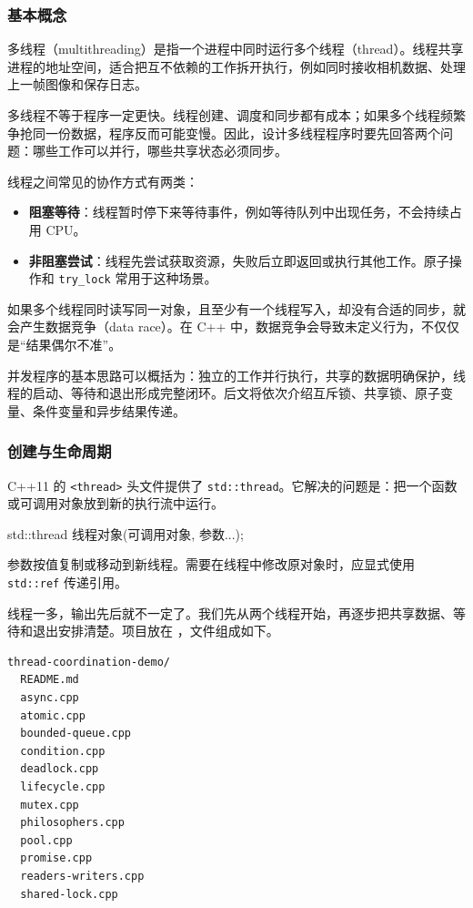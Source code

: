 
\subsubsection{基本概念}
多线程（multithreading）是指一个进程中同时运行多个线程（thread）。线程共享进程的地址空间，适合把互不依赖的工作拆开执行，例如同时接收相机数据、处理上一帧图像和保存日志。

多线程不等于程序一定更快。线程创建、调度和同步都有成本；如果多个线程频繁争抢同一份数据，程序反而可能变慢。因此，设计多线程程序时要先回答两个问题：哪些工作可以并行，哪些共享状态必须同步。

线程之间常见的协作方式有两类：
\begin{itemize}
    \item \textbf{阻塞等待}：线程暂时停下来等待事件，例如等待队列中出现任务，不会持续占用 CPU。
    \item \textbf{非阻塞尝试}：线程先尝试获取资源，失败后立即返回或执行其他工作。原子操作和 \texttt{try\_lock} 常用于这种场景。
\end{itemize}

如果多个线程同时读写同一对象，且至少有一个线程写入，却没有合适的同步，就会产生数据竞争（data race）。在 C++ 中，数据竞争会导致未定义行为，不仅仅是“结果偶尔不准”。

\begin{conclusion}
并发程序的基本思路可以概括为：独立的工作并行执行，共享的数据明确保护，线程的启动、等待和退出形成完整闭环。后文将依次介绍互斥锁、共享锁、原子变量、条件变量和异步结果传递。
\end{conclusion}

\subsubsection{创建与生命周期}
C++11 的 \texttt{<thread>} 头文件提供了 \texttt{std::thread}。它解决的问题是：把一个函数或可调用对象放到新的执行流中运行。

\begin{tcode}
std::thread 线程对象(可调用对象, 参数...);
\end{tcode}

参数按值复制或移动到新线程。需要在线程中修改原对象时，应显式使用 \texttt{std::ref} 传递引用。

线程一多，输出先后就不一定了。我们先从两个线程开始，再逐步把共享数据、等待和退出安排清楚。项目放在 ，文件组成如下。
\begin{lstlisting}[language={}]
thread-coordination-demo/
  README.md
  async.cpp
  atomic.cpp
  bounded-queue.cpp
  condition.cpp
  deadlock.cpp
  lifecycle.cpp
  mutex.cpp
  philosophers.cpp
  pool.cpp
  promise.cpp
  readers-writers.cpp
  shared-lock.cpp
\end{lstlisting}

